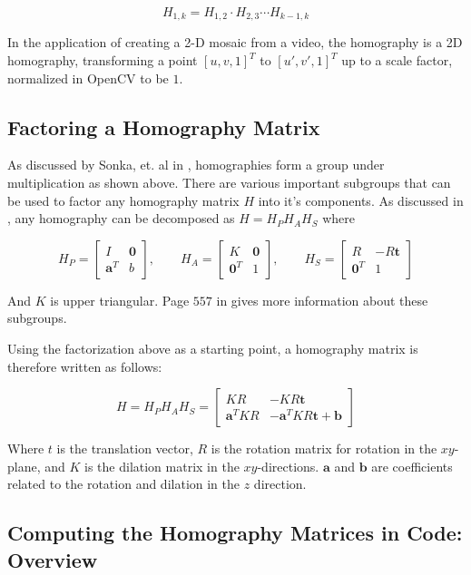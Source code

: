 \documentclass{article}
\begin{document}
\[H_{1, k} = H_{1, 2} \cdot H_{2, 3} \cdots H_{k - 1, k}\]

In the application of creating a 2-D mosaic from a video, the homography is a
2D homography, transforming a point $[u, v, 1]^T$ to $[u', v', 1]^T$ up to a
scale factor, normalized in OpenCV to be $1$. 

\subsection{Factoring a Homography Matrix}

As discussed by Sonka, et. al in \cite{sonkatext}, homographies form a group
under multiplication as shown above. There are various important subgroups that
can be used to factor any homography matrix $H$ into it's components. As
discussed in \cite{sonkatext}, any homography can be decomposed as $H = H_P H_A H_S$ where 

\[
H_P = \begin{bmatrix} I & \mathbf{0} \\ \mathbf{a}^T & b \end{bmatrix}, \qquad
H_A = \begin{bmatrix} K & \mathbf{0} \\ \mathbf{0}^T & 1 \end{bmatrix}, \qquad
H_S = \begin{bmatrix} R & -R\mathbf{t} \\ \mathbf{0}^T & 1 \end{bmatrix}
\] 

And $K$ is upper triangular. Page $557$ in \cite{sonkatext} gives more
information about these subgroups. 

Using the factorization above as a starting point, a homography matrix is
therefore written as follows:

\[H = H_P H_A H_S = \begin{bmatrix}KR & -KR\mathbf{t} \\ \mathbf{a}^TKR &
 -\mathbf{a}^TKR\mathbf{t} + \mathbf{b} \end{bmatrix}\] 

Where $t$ is the translation vector, $R$ is the rotation matrix for rotation in
the $xy$-plane, and $K$ is the dilation matrix in the $xy$-directions.
$\mathbf{a}$ and $\mathbf{b}$ are coefficients related to the rotation and
dilation in the $z$ direction.

\subsection{Computing the Homography Matrices in Code: Overview}
\end{document}
